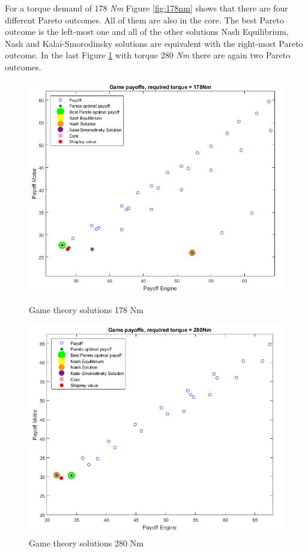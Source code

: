 For a torque demand of 178 \textit{Nm} Figure \ref{fig:178nm} shows that there are four different Pareto outcomes. All of them are also in the core. The best Pareto outcome is the left-most one and all of the other solutions Nash Equilibrium, Nash and Kalai-Smorodinsky solutions are equivalent with the right-most Pareto outcome. In the last Figure \ref{fig:280nm} with torque 280 \textit{Nm} there are again two Pareto outcomes.

\begin{figure}[h]
\centering
\begin{minipage}{.5\textwidth}
 	\centering
	\includegraphics[scale=0.38]{figures/gametheory/178nm}
	\caption{Game theory solutions 178 Nm}
	\label{fig:178nm}
\end{minipage}%
\begin{minipage}{.5\textwidth}
  	\centering
	\includegraphics[scale=0.392]{figures/gametheory/280nm}
  	\caption{Game theory solutions 280 Nm}
  	\label{fig:280nm}
\end{minipage}
\end{figure}

